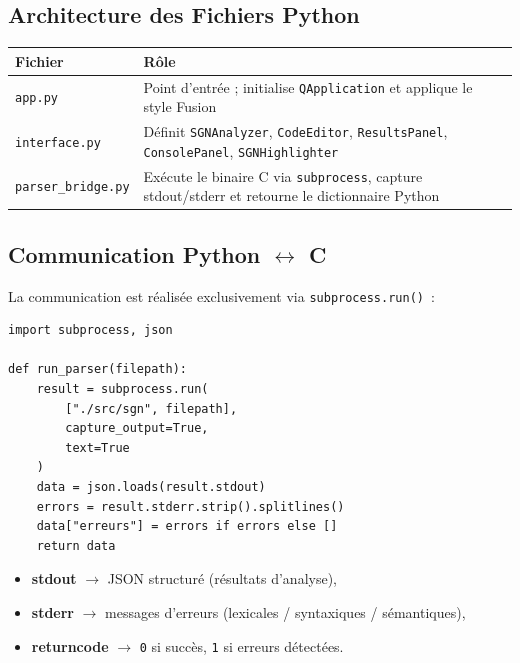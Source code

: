 \documentclass[a4paper,12pt]{article}
\begin{document}
\subsection{Architecture des Fichiers Python}

\begin{center}
\begin{tabular}{ll}
\toprule
\textbf{Fichier} & \textbf{Rôle} \\
\midrule
\texttt{app.py} & Point d'entrée ; initialise \texttt{QApplication} et applique le style Fusion \\
\texttt{interface.py} & Définit \texttt{SGNAnalyzer}, \texttt{CodeEditor}, \texttt{ResultsPanel}, \texttt{ConsolePanel}, \texttt{SGNHighlighter} \\
\texttt{parser\_bridge.py} & Exécute le binaire C via \texttt{subprocess}, capture stdout/stderr et retourne le dictionnaire Python \\
\bottomrule
\end{tabular}
\end{center}

\subsection{Communication Python $\leftrightarrow$ C}

La communication est réalisée exclusivement via \texttt{subprocess.run()}~:

\begin{lstlisting}[caption={Pont Python–C dans parser\_bridge.py}, style=python, label=lst:bridge]
import subprocess, json

def run_parser(filepath):
    result = subprocess.run(
        ["./src/sgn", filepath],
        capture_output=True,
        text=True
    )
    data = json.loads(result.stdout)
    errors = result.stderr.strip().splitlines()
    data["erreurs"] = errors if errors else []
    return data
\end{lstlisting}

\begin{itemize}[leftmargin=1.5em]
  \item \textbf{stdout} $\rightarrow$ JSON structuré (résultats d'analyse),
  \item \textbf{stderr} $\rightarrow$ messages d'erreurs (lexicales / syntaxiques / sémantiques),
  \item \textbf{returncode} $\rightarrow$ \texttt{0} si succès, \texttt{1} si erreurs détectées.
\end{itemize}
\end{document}
